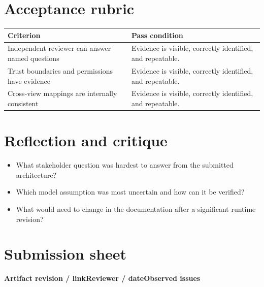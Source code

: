\documentclass[10pt,letterpaper]{article}
\begin{document}
\section{Acceptance rubric}
\small
\begin{tabularx}{\linewidth}{@{}YY@{}}
\toprule
\textbf{Criterion} & \textbf{Pass condition} \\
\midrule
Independent reviewer can answer named questions & Evidence is visible, correctly identified, and repeatable. \\
Trust boundaries and permissions have evidence & Evidence is visible, correctly identified, and repeatable. \\
Cross-view mappings are internally consistent & Evidence is visible, correctly identified, and repeatable. \\
\bottomrule
\end{tabularx}
\normalsize
\section{Reflection and critique}
\begin{itemize}
\item What stakeholder question was hardest to answer from the submitted architecture?
\item Which model assumption was most uncertain and how can it be verified?
\item What would need to change in the documentation after a significant runtime revision?
\end{itemize}
\section{Submission sheet}
\textbf{Artifact revision / link}\textbf{Reviewer / date}\textbf{Observed issues}
\end{document}
